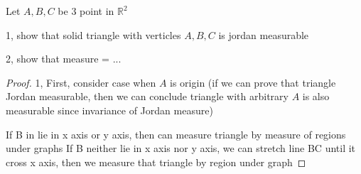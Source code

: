 \begin{exercise}
Let \(A, B, C\) be 3 point in \(\mathbb R^2\)

1, show that solid triangle with verticles \(A, B, C\) is jordan measurable

2, show that measure = ...
\end{exercise}

\begin{proof}
1, First, consider case when \(A\) is origin (if we can prove that triangle Jordan
 measurable, then we can conclude triangle with arbitrary \(A\) is also measurable 
 since invariance of Jordan measure)

 If B in lie in x axis or y axis, then can measure triangle by measure of regions under graphs
 If B neither lie in x axis nor y axis, we can stretch line BC until it cross x axis,
 then we measure that triangle by region under graph
\end{proof}